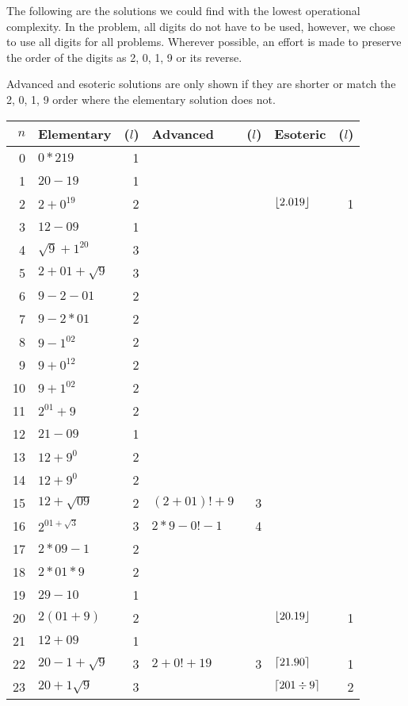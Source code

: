 The following are the solutions we could find with the lowest operational complexity.
In the problem, all digits do not have to be used, however, we chose to use all digits for all problems.
Wherever possible, an effort is made to preserve the order of the digits as 2, 0, 1, 9 or its reverse.

Advanced and esoteric solutions are only shown if they are shorter or match the 2, 0, 1, 9 order where the elementary solution does not.

\begin{longtable}{r l r l r l r}
\toprule
$n$ & Elementary & ($l$) & Advanced & ($l$) & Esoteric & ($l$) \\ \midrule
\endhead%
0 & $0*219$ & 1 \\ \midrule
1 & $20-19$ & 1 \\ \midrule
2 & $2+0^{19}$ & 2 & & & $\lfloor2.019\rfloor$ & 1 \\ \midrule
3 & $12-09$ & 1 \\ \midrule
4 & $\sqrt{9}+1^{20}$ & 3 \\ \midrule
5 & $2+01+\sqrt{9}$ & 3 \\ \midrule
6 & $9-2-01$ & 2 \\ \midrule
7 & $9-2*01$ & 2 \\ \midrule
8 & $9-1^{02}$ & 2 \\ \midrule
9 & $9+0^{12}$ & 2 \\ \midrule
\midrule
10 & $9+1^{02}$ & 2 \\ \midrule
11 & $2^{01}+9$ & 2 \\ \midrule
12 & $21-09$ & 1 \\ \midrule
13 & $12+9^0$ & 2 \\ \midrule
14 & $12+9^0$ & 2 \\ \midrule
15 & $12+\sqrt{09}$ & 2 & $(2+01)!+9$ & 3 \\ \midrule
16 & $2^{01+\sqrt{3}}$ & 3 & $2*9-0!-1$ & 4 \\ \midrule
17 & $2*09-1$ & 2& \\ \midrule
18 & $2*01*9$ & 2 \\ \midrule
19 & $29-10$ & 1 \\ \midrule
\midrule
20 & $2(01+9)$ & 2 & & & $\lfloor20.19\rfloor$ & 1 \\ \midrule
21 & $12+09$ & 1 \\ \midrule
22 & $20-1+\sqrt{9}$& 3 & $2+0!+19$ & 3 & $\lceil21.90\rceil$ & 1 \\ \midrule
23 & $20+1\sqrt{9}$ & 3 & & & $\lceil201\div9\rceil$ & 2 \\ \midrule

\end{longtable}
